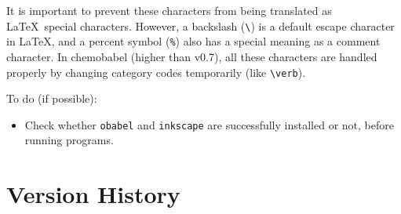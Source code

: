 \documentclass[12pt]{ltjsarticle}
\begin{document}
It is important to prevent these characters from being translated as
\LaTeX\ special characters.
However, a backslash (\verb|\|) is a default escape character in \LaTeX,
and a percent symbol (\verb|%|) also has a special meaning as a comment character.
In \textsf{chemobabel} (higher than v0.7), all these characters are
handled properly by changing category codes temporarily (like \verb+\verb+). \\

\clearpage

To do (if possible):
\begin{itemize}
\item Check whether \texttt{obabel} and \texttt{inkscape} are successfully
installed or not, before running programs.
\end{itemize}

\section{Version History}
\end{document}
